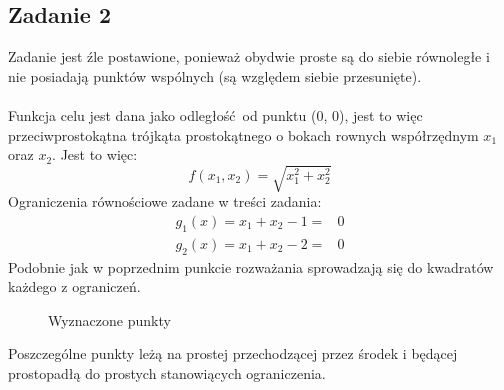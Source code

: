 \documentclass[a4paper, 12pt]{article}
\begin{document}
        \subsection{Zadanie 2}
            Zadanie jest źle postawione, ponieważ obydwie proste są do siebie równoległe i nie posiadają
            punktów wspólnych (są względem siebie przesunięte). 
            \\ \\
            Funkcja celu jest dana jako odległość od punktu (0, 0), jest to więc przeciwprostokątna
            trójkąta prostokątnego o bokach rownych współrzędnym $x_1$ oraz $x_2$. Jest to więc:
            $$
                f(x_1, x_2) = \sqrt{x_1^2 + x_2^2}
            $$
            Ograniczenia równościowe zadane w treści zadania: 
            $$
                \begin{aligned}
                    g_1(x) = x_1 + x_2 - 1 =& 0 \\
                    g_2(x) = x_1 + x_2 - 2 =& 0
                \end{aligned}
            $$
            Podobnie jak w poprzednim punkcie rozważania sprowadzają się do kwadratów każdego z
            ograniczeń.
            \begin{figure}[H]
                \centering
                \def \svgwidth{0.7\columnwidth}
                
                \caption{Wyznaczone punkty}
            \end{figure}\noindent
            Poszczególne punkty leżą na prostej przechodzącej przez środek i będącej prostopadłą
            do prostych stanowiących ograniczenia. 
\end{document}
